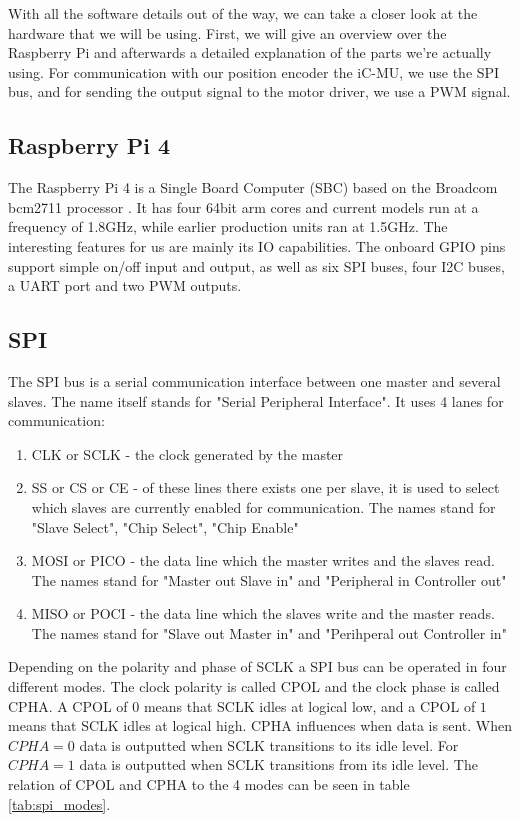 With all the software details out of the way, we can take a closer look at the hardware that we will be using.
First, we will give an overview over the Raspberry Pi and afterwards a detailed explanation of the parts we're actually using.
For communication with our position encoder the iC-MU, we use the SPI bus, and for sending the output signal to the motor driver, we use a PWM signal.

\subsection{Raspberry Pi 4}
\label{sec:background:hardware:pi}

The Raspberry Pi 4 is a Single Board Computer (SBC) based on the Broadcom bcm2711 processor \cite{bcm2711}.
It has four 64bit arm cores and current models run at a frequency of 1.8GHz, while earlier production units ran at 1.5GHz.
The interesting features for us are mainly its IO capabilities.
The onboard GPIO pins support simple on/off input and output, as well as six SPI buses, four I2C buses, a UART port and two PWM outputs.

\subsection{SPI}
\label{sec:background:hardware:spi}

The SPI bus is a serial communication interface between one master and several slaves.
The name itself stands for "Serial Peripheral Interface".
It uses 4 lanes for communication\cite[p. 220]{SensornetzwerkeInTheorieUndPraxis}:

\begin{enumerate}
    \item CLK or SCLK - the clock generated by the master
    \item SS or CS or CE - of these lines there exists one per slave, it is used to select which slaves are currently enabled for communication. The names stand for "Slave Select", "Chip Select", "Chip Enable"
    \item MOSI or PICO - the data line which the master writes and the slaves read. The names stand for "Master out Slave in" and "Peripheral in Controller out"
    \item MISO or POCI - the data line which the slaves write and the master reads. The names stand for "Slave out Master in" and "Perihperal out Controller in"
\end{enumerate}

Depending on the polarity and phase of SCLK a SPI bus can be operated in four different modes.
The clock polarity is called CPOL and the clock phase is called CPHA.
A CPOL of $0$ means that SCLK idles at logical low, and a CPOL of $1$ means that SCLK idles at logical high.
CPHA influences when data is sent.
When $CPHA = 0$ data is outputted when SCLK transitions to its idle level.
For $CPHA = 1$ data is outputted when SCLK transitions from its idle level.
The relation of CPOL and CPHA to the 4 modes can be seen in table \ref{tab:spi_modes}.

